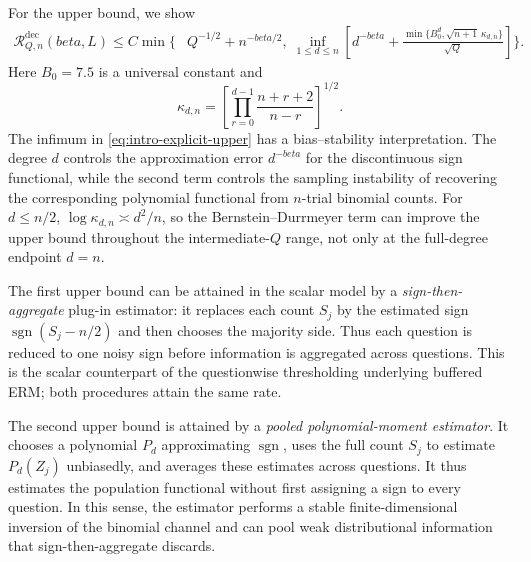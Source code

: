 \documentclass[11pt]{article}
\def\beta{beta}%
\newcommand{\sgn}{\operatorname{sgn}}
\newcommand{\calR}{\mathcal R}
\begin{document}
For the upper bound, we show
\begin{equation}
\label{eq:intro-explicit-upper}
\begin{split}
\calR^{\mathrm{dec}}_{Q,n}(\beta,L)
\le C\min\Biggl\{&
Q^{-1/2}+n^{-\beta/2},\;
\inf_{1\le d\le n}
\left[
d^{-\beta}
+
\frac{\min\{B_0^d,\sqrt{n+1}\,\kappa_{d,n}\}}{\sqrt Q}
\right]
\Biggr\}.
\end{split}
\end{equation}
Here $B_0=7.5$ is a universal constant and
\[
\kappa_{d,n}
=
\left[
\prod_{r=0}^{d-1}\frac{n+r+2}{n-r}
\right]^{1/2}.
\]
The infimum in \eqref{eq:intro-explicit-upper} has a bias--stability interpretation.  The degree $d$ controls the approximation error $d^{-\beta}$ for the discontinuous sign functional, while the second term controls the sampling instability of recovering the corresponding polynomial functional from $n$-trial binomial counts.  For $d\le n/2$, $\log\kappa_{d,n}\asymp d^2/n$, so the Bernstein--Durrmeyer term can improve the upper bound throughout the intermediate-$Q$ range, not only at the full-degree endpoint $d=n$.

The first upper bound can be attained in the scalar model by a \emph{sign-then-aggregate} plug-in estimator: it replaces each count $S_j$ by the estimated sign $\sgn(S_j-n/2)$ and then chooses the majority side.  Thus each question is reduced to one noisy sign before information is aggregated across questions.  This is the scalar counterpart of the questionwise thresholding underlying buffered ERM; both procedures attain the same rate. %

The second upper bound is attained by a \emph{pooled polynomial-moment estimator}.  It chooses a polynomial $P_d$ approximating $\sgn$, uses the full count $S_j$ to estimate $P_d(Z_j)$ unbiasedly, and averages these estimates across questions.  It thus estimates the population functional without first assigning a sign to every question.  In this sense, the estimator performs a stable finite-dimensional inversion of the binomial channel and can pool weak distributional information that sign-then-aggregate discards.
\end{document}
